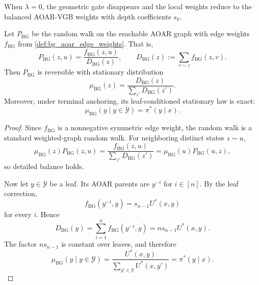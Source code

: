 \documentclass{article}
\numberwithin{theorem}{section}
\numberwithin{proposition}{section}
\numberwithin{corollary}{section}
\numberwithin{lemma}{section}
\numberwithin{conjecture}{section}
\numberwithin{remark}{section}
\numberwithin{definition}{section}
\numberwithin{assumption}{section}
\numberwithin{example}{section}
\newcommand{\calY}{{\mathcal{Y}}}
\newcommand{\lbra}[1]{\left[#1\right]}
\begin{document}
\begin{remark}[$\lambda=0$ recovers balanced AOAR-VGB]
When $\lambda=0$, the geometric gate disappears and the local weights reduce to the balanced AOAR-VGB weights with depth coefficients $s_k$.
\end{remark}

\begin{theorem}
\label{thm:bg_aoar_stationarity}
Let $P_{\mathrm{BG}}$ be the random walk on the reachable AOAR graph with edge weights $f_{\mathrm{BG}}$ from \cref{def:bg_aoar_edge_weights}. That is,
\begin{equation*}
    P_{\mathrm{BG}}(z,u)=\frac{f_{\mathrm{BG}}(z,u)}{D_{\mathrm{BG}}(z)},\qquad
    D_{\mathrm{BG}}(z):=\sum_{v\sim z}f_{\mathrm{BG}}(z,v).
\end{equation*}
Then $P_{\mathrm{BG}}$ is reversible with stationary distribution
\begin{equation*}
    \mu_{\mathrm{BG}}(z)=\frac{D_{\mathrm{BG}}(z)}{\sum_{z'}D_{\mathrm{BG}}(z')}.
\end{equation*}
Moreover, under terminal anchoring, its leaf-conditioned stationary law is exact:
\begin{equation*}
    \mu_{\mathrm{BG}}(y\mid y\in\calY)=\pi^*(y\mid x).
\end{equation*}
\end{theorem}

\begin{proof}
Since $f_{\mathrm{BG}}$ is a nonnegative symmetric edge weight, the random walk is a standard weighted-graph random walk. For neighboring distinct states $z\sim u$,
\begin{equation*}
    \mu_{\mathrm{BG}}(z)P_{\mathrm{BG}}(z,u)
    =
    \frac{f_{\mathrm{BG}}(z,u)}{\sum_{z'}D_{\mathrm{BG}}(z')}
    =
    \mu_{\mathrm{BG}}(u)P_{\mathrm{BG}}(u,z),
\end{equation*}
so detailed balance holds.

Now let $y\in\calY$ be a leaf. Its AOAR parents are $y^{-i}$ for $i\in\lbra{n}$. By the leaf correction,
\begin{equation*}
    f_{\mathrm{BG}}(y^{-i},y)=s_{n-1}U^*(x,y)
\end{equation*}
for every $i$. Hence
\begin{equation*}
    D_{\mathrm{BG}}(y)=\sum_{i=1}^n f_{\mathrm{BG}}(y^{-i},y)=n s_{n-1}U^*(x,y).
\end{equation*}
The factor $ns_{n-1}$ is constant over leaves, and therefore
\begin{equation*}
    \mu_{\mathrm{BG}}(y\mid y\in\calY)
    =
    \frac{U^*(x,y)}{\sum_{y'\in\calY}U^*(x,y')}
    =
    \pi^*(y\mid x).
\end{equation*}
\end{proof}
\end{document}
